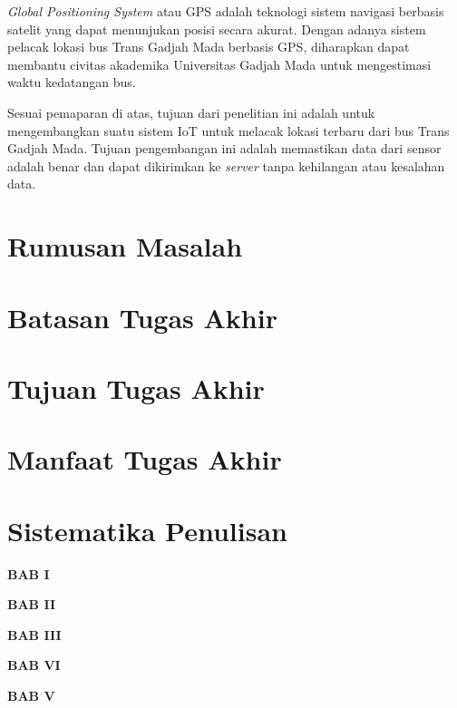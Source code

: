 \textit{Global Positioning System} atau GPS adalah teknologi sistem navigasi berbasis satelit yang dapat menunjukan posisi secara akurat. Dengan adanya sistem pelacak lokasi bus Trans Gadjah Mada berbasis GPS, diharapkan dapat membantu civitas akademika Universitas Gadjah Mada untuk mengestimasi waktu kedatangan bus.

Sesuai pemaparan di atas, tujuan dari penelitian ini adalah untuk mengembangkan suatu sistem IoT untuk melacak lokasi terbaru dari bus Trans Gadjah Mada. Tujuan pengembangan ini adalah memastikan data dari sensor adalah benar dan dapat dikirimkan ke \textit{server} tanpa kehilangan atau kesalahan data.

\section{Rumusan Masalah}
\section{Batasan Tugas Akhir}
\section{Tujuan Tugas Akhir}
\section{Manfaat Tugas Akhir}
\section{Sistematika Penulisan}
\textbf{BAB I}

\textbf{BAB II}

\textbf{BAB III}

\textbf{BAB VI}

\textbf{BAB V}